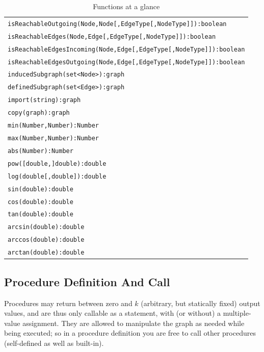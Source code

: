 \begin{table}[htbp]
\begin{tabular}{|l|}
\texttt{isReachableOutgoing(Node,Node[,EdgeType[,NodeType]]):boolean}\\
\texttt{isReachableEdges(Node,Edge[,EdgeType[,NodeType]]):boolean}\\
\texttt{isReachableEdgesIncoming(Node,Edge[,EdgeType[,NodeType]]):boolean}\\
\texttt{isReachableEdgesOutgoing(Node,Edge[,EdgeType[,NodeType]]):boolean}\\
\hline
\texttt{inducedSubgraph(set<Node>):graph}\\
\texttt{definedSubgraph(set<Edge>):graph}\\
\texttt{import(string):graph}\\
\texttt{copy(graph):graph}\\
\hline
\texttt{min(Number,Number):Number}\\
\texttt{max(Number,Number):Number}\\
\texttt{abs(Number):Number}\\
\hline
\texttt{pow([double,]double):double}\\
\texttt{log(double[,double]):double}\\
\hline
\texttt{sin(double):double}\\
\texttt{cos(double):double}\\
\texttt{tan(double):double}\\
\hline
\texttt{arcsin(double):double}\\
\texttt{arccos(double):double}\\
\texttt{arctan(double):double}\\
\hline
\end{tabular}
\caption{Functions at a glance}
\label{funcstab}
\end{table}


\subsection{Procedure Definition And Call}\label{sub:procedures}\label{sec:proccall} 

Procedures may return between zero and $k$ (arbitrary, but statically fixed) output values, and are thus only callable as a statement, with (or without) a multiple-value assignment.
They are allowed to manipulate the graph as needed while being executed;
so in a procedure definition you are free to call other procedures (self-defined as well as built-in).

